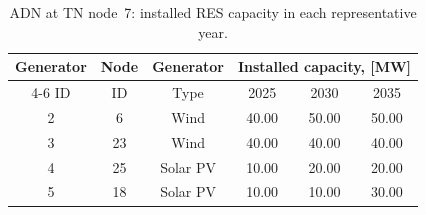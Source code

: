 \begin{table}[htbp!]
    \centering
    \caption{ADN at TN node~7: installed RES capacity in each representative year.}
    \begin{tabular}{ccc ccc}
        \toprule
        Generator   & Node  & Generator & \multicolumn{3}{c}{Installed capacity, [MW]}\\  \cmidrule{4-6}
        ID          & ID    & Type      & 2025 & 2030 & 2035 \\ 
        \midrule
        2 & 6 & Wind & 40.00 & 50.00 & 50.00\\
        3 & 23 & Wind & 40.00 & 40.00 & 40.00\\
        4 & 25 & Solar PV & 10.00 & 20.00 & 20.00\\
        5 & 18 & Solar PV & 10.00 & 10.00 & 30.00\\
        \bottomrule
    \end{tabular}
    \label{tab:cs3_adn_node_7_res_generators}
\end{table}
